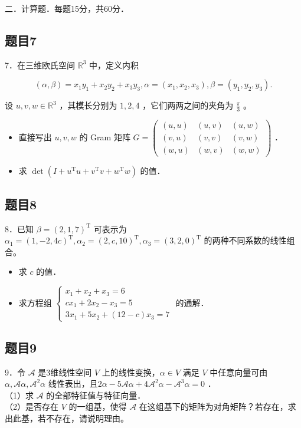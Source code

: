 \documentclass{article}
\begin{document}
二．计算题．每题15分，共60分．\\

\subsection{题目7}
7．在三维欧氏空间 \(\mathbb{R}^{3}\) 中，定义内积

\[
(\alpha, \beta)=x_{1} y_{1}+x_{2} y_{2}+x_{3} y_{3}, \alpha=\left(x_{1}, x_{2}, x_{3}\right), \beta=\left(y_{1}, y_{2}, y_{3}\right) .
\]

设 \(u, v, w \in \mathbb{R}^{3}\) ，其模长分别为 \(1,2,4\) ，它们两两之间的夹角为 \(\frac{\pi}{3}\) 。

\begin{itemize}
  \item[（1）] 直接写出 \(u, v, w\) 的 Gram 矩阵 \(G=\left(\begin{array}{ccc}(u, u) & (u, v) & (u, w) \\ (v, u) & (v, v) & (v, w) \\ (w, u) & (w, v) & (w, w)\end{array}\right)\) ．
  \item[（2）] 求 \(\operatorname{det}\left(I+u^{\mathrm{T}} u+v^{\mathrm{T}} v+w^{\mathrm{T}} w\right)\) 的值．
\end{itemize}

\subsection{题目8}
8．已知 \(\beta=(2,1,7)^{\mathrm{T}}\) 可表示为 \(\alpha_{1}=(1,-2,4 c)^{\mathrm{T}}, \alpha_{2}=(2, c, 10)^{\mathrm{T}}, \alpha_{3}=(3,2,0)^{\mathrm{T}}\) 的两种不同系数的线性组合。

\begin{itemize}
  \item[（1）] 求 \(c\) 的值．
  \item[（2）] 求方程组 \(\left\{\begin{array}{l}x_{1}+x_{2}+x_{3}=6 \\ c x_{1}+2 x_{2}-x_{3}=5 \\ 3 x_{1}+5 x_{2}+(12-c) x_{3}=7\end{array}\right.\) 的通解．
\end{itemize}

\subsection{题目9}
9．令 \(\mathcal{A}\) 是3维线性空间 \(V\) 上的线性变换，\(\alpha \in V\) 满足 \(V\) 中任意向量可由 \(\alpha, \mathcal{A} \alpha, \mathcal{A}^{2} \alpha\) 线性表出，且\(2 \alpha-5 \mathcal{A} \alpha+4 \mathcal{A}^{2} \alpha-\mathcal{A}^{3} \alpha=0\) ．\\
（1）求 \(\mathcal{A}\) 的全部特征值与特征向量．\\
（2）是否存在 \(V\) 的一组基，使得 \(\mathcal{A}\) 在这组基下的矩阵为对角矩阵？若存在，求出此基，若不存在，请说明理由。
\end{document}
